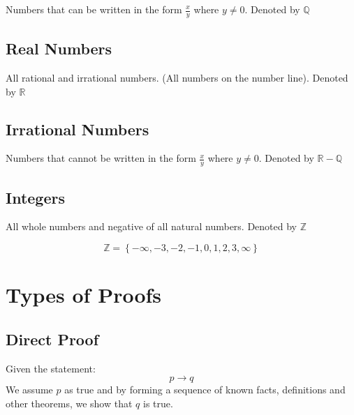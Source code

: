 \documentclass[12pt letter]{report}
\begin{document}
Numbers that can be written in the form $\frac{x}{y}$ where $y \neq 0$. Denoted by $\mathbb{Q}$

\subsection{Real Numbers}

All rational and irrational numbers. (All numbers on the number line). Denoted by $\mathbb{R}$

\subsection{Irrational Numbers}

Numbers that cannot be written in the form $\frac{x}{y}$ where $y \neq 0$. Denoted by $\mathbb{R} - \mathbb{Q}$


\subsection{Integers}

All whole numbers and negative of all natural numbers. Denoted by $\mathbb{Z}$

\[
	\mathbb{Z} = \left\{ -\infty, -3, -2, -1, 0, 1, 2, 3, \infty \right\}
\]

\section{Types of Proofs}

\subsection{Direct Proof}

Given the statement:
\[
	p \to q
\]
We assume $p$ as true and by forming a sequence of known facts, definitions and other theorems, we show that $q$ is true.

\end{document}
